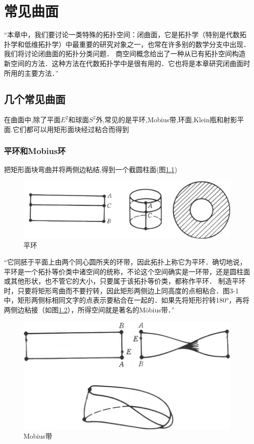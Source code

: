 \chapter{常见曲面}
“本章中，我们要讨论一类特殊的拓扑空间：闭曲面，它是拓扑学（特别是代数拓扑学和低维拓扑学）中最重要的研究对象之一，也常在许多别的数学分支中出现．我们将讨论闭曲面的拓扑分类问题．
商空间概念给出了一种从已有拓扑空间构造新空间的方法．这种方法在代数拓扑学中是很有用的．它也将是本章研究闭曲面时所用的主要方法．”

\section{几个常见曲面}
在曲面中,除了平面\(E^2\)和球面\(S^2\)外,常见的是平环,Mobius带,环面,Klein瓶和射影平面.它们都可以用矩形面块经过粘合而得到
\subsection*{平环和Mobius环}
把矩形面块弯曲并将两侧边粘结,得到一个截圆柱面(图\ref{fig:enter-label})
\begin{figure}[H]
    \centering
    \includegraphics[width=0.5\linewidth]{image.png}
    \caption{平环}
    \label{fig:enter-label}
\end{figure}
“它同胚于平面上由两个同心圆所夹的环带，因此拓扑上称它为平环．确切地说，平环是一个拓扑等价类中诸空间的统称，不论这个空间确实是一环带，还是圆柱面或其他形状，也不管它的大小，只要属于该拓扑等价类，都称作平环．
制造平环时，只要将矩形弯曲而不要拧转，因此矩形两侧边上同高度的点相粘合．图3-1中，矩形两侧标相同文字的点表示要粘合在一起的．如果先将矩形拧转180°，再将两侧边粘接（如图\ref{fig:enter-label_2}），所得空间就是著名的Möbius带．”
\begin{figure}[H]
    \centering
    \includegraphics[width=0.5\linewidth]{image_2.png}
    \caption{Mobius带}
    \label{fig:enter-label_2}
\end{figure}
